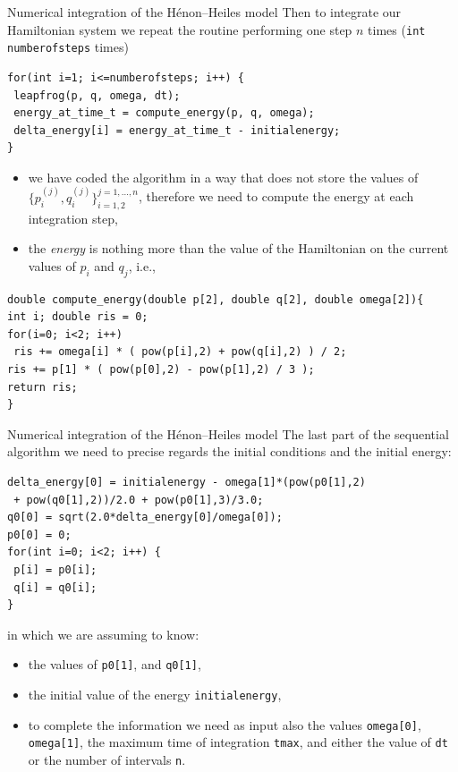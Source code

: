 \documentclass[xcolor={svgnames,usenames}]{beamer}
\begin{document}
\begin{frame}[fragile]{Numerical integration of the H\'enon--Heiles model}
\small\vspace{-1em}
Then to integrate our Hamiltonian system we repeat the routine performing one step $n$ times (\texttt{int numberofsteps} times)
\begin{verbatim}
for(int i=1; i<=numberofsteps; i++) {
 leapfrog(p, q, omega, dt);
 energy_at_time_t = compute_energy(p, q, omega);
 delta_energy[i] = energy_at_time_t - initialenergy;
}
\end{verbatim}
\vspace{-1em}
\begin{itemize}
\item we have coded the algorithm in a way that does not store the values of $\{p_i^{(j)},q_i^{(j)}\}_{i=1,2}^{j=1,\ldots,n}$, therefore we need to compute the energy at each integration step,
\item the \emph{energy} is nothing more than the value of the Hamiltonian on the current values of $p_i$ and $q_j$, i.e.,
\end{itemize}
\begin{verbatim}
double compute_energy(double p[2], double q[2], double omega[2]){
int i; double ris = 0;
for(i=0; i<2; i++)
 ris += omega[i] * ( pow(p[i],2) + pow(q[i],2) ) / 2;
ris += p[1] * ( pow(p[0],2) - pow(p[1],2) / 3 );
return ris;
}
\end{verbatim}
\end{frame}

\begin{frame}[fragile]{Numerical integration of the H\'enon--Heiles model}
The last part of the sequential algorithm we need to precise regards the initial conditions and the initial energy:
\begin{verbatim}
delta_energy[0] = initialenergy - omega[1]*(pow(p0[1],2)
 + pow(q0[1],2))/2.0 + pow(p0[1],3)/3.0;
q0[0] = sqrt(2.0*delta_energy[0]/omega[0]);
p0[0] = 0;
for(int i=0; i<2; i++) {
 p[i] = p0[i];
 q[i] = q0[i];
}
\end{verbatim}
in which we are assuming to know:
\begin{itemize}
\item the values of \texttt{p0[1]}, and \texttt{q0[1]},
\item the initial value of the energy \texttt{initialenergy},
\item to complete the information we need as input also the values \texttt{omega[0]}, \texttt{omega[1]}, the maximum time of integration \texttt{tmax}, and either the value of \texttt{dt} or the number of intervals \texttt{n}.
\end{itemize}
\end{frame}
\end{document}
